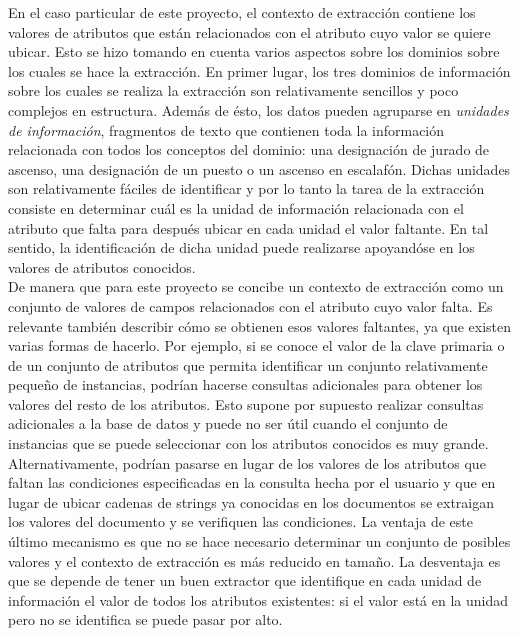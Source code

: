En el caso particular de este proyecto, el contexto de extracción contiene los valores de atributos que están relacionados con el atributo cuyo valor se quiere ubicar. Esto se hizo tomando en cuenta varios aspectos sobre los dominios sobre los cuales se hace la extracción. En primer lugar, los tres dominios de información sobre los cuales se realiza la extracción son relativamente sencillos y poco complejos en estructura. Además de ésto, los datos pueden agruparse en \emph{unidades de información}, fragmentos de texto que contienen toda la información relacionada con todos los conceptos del dominio: una designación de jurado de ascenso, una designación de un puesto o un ascenso en escalafón. Dichas unidades son relativamente fáciles de identificar y por lo tanto la tarea de la extracción consiste en determinar cuál es la unidad de información relacionada con el atributo que falta para después ubicar en cada unidad el valor faltante. En tal sentido, la identificación de dicha unidad puede realizarse apoyandóse en los valores de atributos conocidos. \\

De manera que para este proyecto se concibe un contexto de extracción como un conjunto de valores de campos relacionados con el atributo cuyo valor falta. Es relevante también describir cómo se obtienen esos valores faltantes, ya que existen varias formas de hacerlo. Por ejemplo, si se conoce el valor de la clave primaria o de un conjunto de atributos que permita identificar un conjunto relativamente pequeño de instancias, podrían hacerse consultas adicionales para obtener los valores del resto de los atributos. Esto supone por supuesto realizar consultas adicionales a la base de datos y puede no ser útil cuando el conjunto de instancias que se puede seleccionar con los atributos conocidos es muy grande. \\

Alternativamente, podrían pasarse en lugar de los valores de los atributos que faltan las condiciones especificadas en la consulta hecha por el usuario y que en lugar de ubicar cadenas de strings ya conocidas en los documentos se extraigan los valores del documento y se verifiquen las condiciones. La ventaja de este último mecanismo es que no se hace necesario determinar un conjunto de posibles valores y el contexto de extracción es más reducido en tamaño. La desventaja es que se depende de tener un buen extractor que identifique en cada unidad de información el valor de todos los atributos existentes: si el valor está en la unidad pero no se identifica se puede pasar por alto. \\ 

